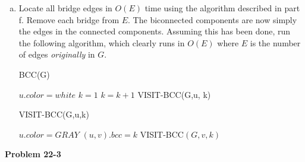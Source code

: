 \documentclass{article}
\begin{document}
\begin{enumerate}[a.]
\item Locate all bridge edges in $O(E)$ time using the algorithm described in part f.  Remove each bridge from $E$.  The biconnected components are now simply the edges in the connected components.  Assuming this has been done, run the following algorithm, which clearly runs in $O(E)$ where $E$ is the number of edges \emph{originally} in $G$.\\

\begin{algorithm}
\caption{BCC(G)}
\begin{algorithmic}[1]
	\State $u.color = white$
\EndFor
\State $k = 1$
		\State $k = k + 1$
		\State VISIT-BCC(G,u, k)
	\EndIf
\EndFor
\end{algorithmic}
\end{algorithm}


\begin{algorithm}
\caption{VISIT-BCC(G,u,k)}
\begin{algorithmic}[1]
\State $u.color = GRAY$
	\State $(u,v).bcc = k$
		\State VISIT-BCC$(G,v,k)$
	\EndIf
\EndFor 
\end{algorithmic}
\end{algorithm}
\end{enumerate}

\noindent\textbf{Problem 22-3}\\
\end{document}
